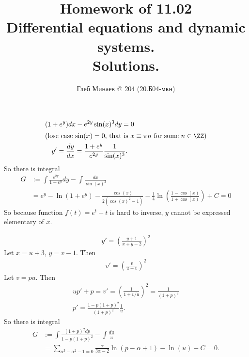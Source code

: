 \documentclass[12pt,a4paper]{article}
\title{Homework of 11.02\\Differential equations and dynamic systems.\\Solutions.}
\author{Глеб Минаев @ 204 (20.Б04-мкн)}
\date{}
\begin{document}
    \maketitle

    \begin{problem*}
        \begin{gather*}
            (1 + e^y) dx - e^{2y} \sin(x)^3 dy = 0\\
            \intertext{(lose case $\sin(x) = 0$, that is $x \equiv \pi n$ for some $n \in \ZZ$)}
            y' = \frac{dy}{dx} = \frac{1 + e^y}{e^{2y}} \frac{1}{\sin(x)^3}.
        \end{gather*}
        So there is integral
        \begin{align*}
            G
            &:= \int \frac{e^{2y}}{1 + e^y}dy - \int \frac{dx}{\sin(x)^3}\\
            &= e^y - \ln(1+e^y) - \frac{\cos(x)}{2(\cos(x)^2-1)} - \frac{1}{4} \ln\left(\frac{1-\cos(x)}{1+\cos(x)}\right) + C = 0
        \end{align*}
        So because function $f(t) = e^t - t$ is hard to inverse, $y$ cannot be expressed elementary of $x$.
    \end{problem*}

    \begin{problem*}
        \begin{gather*}
            y' = \left(\frac{y+1}{x+y-2}\right)^2
        \end{gather*}
        Let $x = u + 3$, $y = v - 1$. Then
        \begin{gather*}
            v' = \left(\frac{v}{u+v}\right)^2
        \end{gather*}
        Let $v = pu$. Then
        \begin{gather*}
            up' + p = v' = \left(\frac{1}{1+v/u}\right)^2 = \frac{1}{(1+p)^2}\\
            p' = \frac{1 - p(1+p)^2}{(1+p)^2} \frac{1}{u}.
        \end{gather*}
        So there is integral
        \begin{align*}
            G
            &:= \int \frac{(1+p)^2 dp}{1 - p(1+p)^2} - \int \frac{du}{u}\\
            &= \sum_{\alpha^3 - \alpha^2 - 1 = 0} \frac{\alpha}{3\alpha - 2} \ln(p - \alpha + 1) - \ln(u) - C = 0.
        \end{align*}
    \end{problem*}
\end{document}
